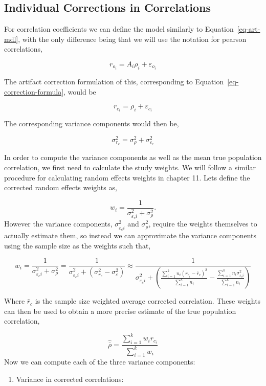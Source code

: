 \documentclass[
  letterpaper,
  DIV=11,
  numbers=noendperiod]{scrreprt}
\providecommand{\tightlist}{%
  \setlength{\itemsep}{0pt}\setlength{\parskip}{0pt}}\usepackage{longtable,booktabs,array}
\begin{document}
\hypertarget{individual-corrections-in-correlations}{%
\subsection{Individual Corrections in
Correlations}\label{individual-corrections-in-correlations}}

For correlation coefficients we can define the model similarly to
Equation~\ref{eq-art-mdl}, with the only difference being that we will
use the notation for pearson correlations,

\[
r_{o_i} = A_i\rho_i + \varepsilon_{o_i}
\]

The artifact correction formulation of this, corresponding to
Equation~\ref{eq-correction-formula}, would be

\[
r_{c_i} = \rho_i + \varepsilon_{c_i}
\]

The corresponding variance components would then be,

\[
\sigma^2_{r_c} = \sigma^2_\rho + \sigma^2_{\varepsilon_c}
\]

In order to compute the variance components as well as the mean true
population correlation, we first need to calculate the study weights. We
will follow a similar procedure for calculating random effects weights
in chapter 11. Lets define the corrected random effects weights as,

\[
w_i = \frac{1}{\sigma^2_{\varepsilon_ci}+\sigma^2_\rho}.
\] However the variance components, \(\sigma^2_{\varepsilon_ci}\) and
\(\sigma^2_\rho\), require the weights themselves to actually estimate
them, so instead we can approximate the variance components using the
sample size as the weights such that,

\[ 
w_i =\frac{1}{\sigma^2_{\varepsilon_ci}+\sigma_\rho^2}= \frac{1}{\sigma^2_{\varepsilon_ci}+(\sigma^2_{r_c}-\sigma^2_{\varepsilon})} \approx \frac{1}{\sigma^2_{\varepsilon_ci}+\left(\frac{\sum^k_{i=1}n_i(r_{c_i} - \bar{r}_c)^2}{\sum^k_{i=1}n_i}-\frac{\sum^k_{i=1}n_i\sigma^2_{\varepsilon_ci}}{\sum^k_{i=1}n_i}\right)} 
\]

Where \(\bar{r}_c\) is the sample size weighted average corrected
correlation. These weights can then be used to obtain a more precise
estimate of the true population correlation,

\[
\hat{\bar{\rho}}=\frac{\sum_{i=1}^k w_i r_{c_i}}{\sum_{i=1}^k w_i}
\] Now we can compute each of the three variance components:

\begin{enumerate}
\def\labelenumi{\arabic{enumi})}
\tightlist
\item
  Variance in corrected correlations:
\end{enumerate}
\end{document}
